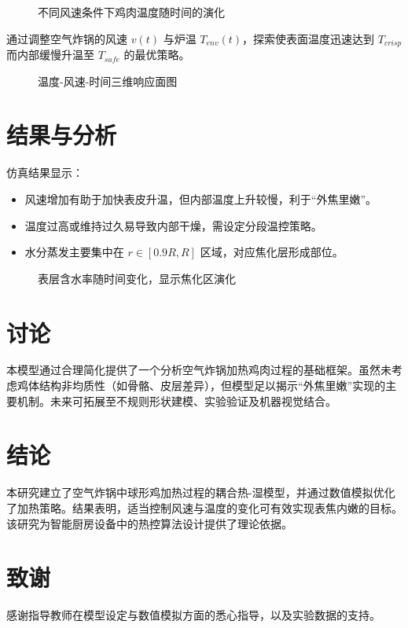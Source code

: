 \documentclass[12pt]{article}
\begin{document}
\begin{figure}[htbp]
\centering
\caption{不同风速条件下鸡肉温度随时间的演化}
\end{figure}

通过调整空气炸锅的风速 $v(t)$ 与炉温 $T_{env}(t)$，探索使表面温度迅速达到 $T_{crisp}$ 而内部缓慢升温至 $T_{safe}$ 的最优策略。

\begin{figure}[htbp]
\centering
\caption{温度-风速-时间三维响应面图}
\end{figure}

\section{结果与分析}
仿真结果显示：
\begin{itemize}
\item 风速增加有助于加快表皮升温，但内部温度上升较慢，利于“外焦里嫩”。
\item 温度过高或维持过久易导致内部干燥，需设定分段温控策略。
\item 水分蒸发主要集中在 $r \in [0.9R, R]$ 区域，对应焦化层形成部位。
\end{itemize}

\begin{figure}[htbp]
\centering
\caption{表层含水率随时间变化，显示焦化区演化}
\end{figure}

\section{讨论}
本模型通过合理简化提供了一个分析空气炸锅加热鸡肉过程的基础框架。虽然未考虑鸡体结构非均质性（如骨骼、皮层差异），但模型足以揭示“外焦里嫩”实现的主要机制。未来可拓展至不规则形状建模、实验验证及机器视觉结合。

\section{结论}
本研究建立了空气炸锅中球形鸡加热过程的耦合热-湿模型，并通过数值模拟优化了加热策略。结果表明，适当控制风速与温度的变化可有效实现表焦内嫩的目标。该研究为智能厨房设备中的热控算法设计提供了理论依据。

\section*{致谢}
感谢指导教师在模型设定与数值模拟方面的悉心指导，以及实验数据的支持。
\end{document}
